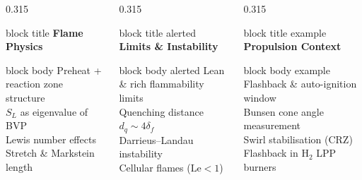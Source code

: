 \documentclass[12pt,aspectratio=169]{beamer}
\newcommand{\Le}{\mathrm{Le}}
\newcommand{\SL}{S_L}
\newcommand{\lf}{\delta_f}
\begin{document}
{\begin{frame}[plain, c]
  \begin{columns}[t, totalwidth=\textwidth]
    \begin{column}{0.315\textwidth}
      \begin{beamercolorbox}[rounded=true,wd=\linewidth,
                             sep=6pt,center]{block title}
        \textbf{\small Flame Physics}
      \end{beamercolorbox}
      \vspace{3pt}
      \begin{beamercolorbox}[rounded=true,wd=\linewidth,
                             sep=6pt,center]{block body}
        \color{ashgrey}\fontsize{7.5}{10}\selectfont
        Preheat + reaction zone structure\\[3pt]
        $\SL$ as eigenvalue of BVP\\[3pt]
        Lewis number effects\\[3pt]
        Stretch \& Markstein length
      \end{beamercolorbox}
    \end{column}
    \hfill
    \begin{column}{0.315\textwidth}
      \begin{beamercolorbox}[rounded=true,wd=\linewidth,
                             sep=6pt,center]{block title alerted}
        \textbf{\small Limits \& Instability}
      \end{beamercolorbox}
      \vspace{3pt}
      \begin{beamercolorbox}[rounded=true,wd=\linewidth,
                             sep=6pt,center]{block body alerted}
        \color{ashgrey}\fontsize{7.5}{10}\selectfont
        Lean \& rich flammability limits\\[3pt]
        Quenching distance $d_q \sim 4\lf$\\[3pt]
        Darrieus--Landau instability\\[3pt]
        Cellular flames ($\Le < 1$)
      \end{beamercolorbox}
    \end{column}
    \hfill
    \begin{column}{0.315\textwidth}
      \begin{beamercolorbox}[rounded=true,wd=\linewidth,
                             sep=6pt,center]{block title example}
        \textbf{\small Propulsion Context}
      \end{beamercolorbox}
      \vspace{3pt}
      \begin{beamercolorbox}[rounded=true,wd=\linewidth,
                             sep=6pt,center]{block body example}
        \color{white}\fontsize{7.5}{10}\selectfont
        Flashback \& auto-ignition window\\[3pt]
        Bunsen cone angle measurement\\[3pt]
        Swirl stabilisation (CRZ)\\[3pt]
        Flashback in H$_2$ LPP burners
      \end{beamercolorbox}
    \end{column}
  \end{columns}


\end{frame}}
\end{document}
